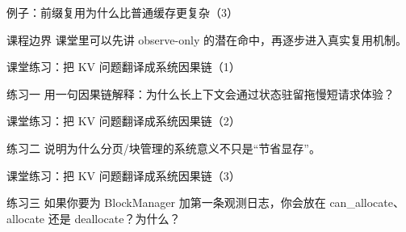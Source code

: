\begin{frame}{例子：前缀复用为什么比普通缓存更复杂（3）}
\begin{block}{课程边界}
    课堂里可以先讲 observe-only 的潜在命中，再逐步进入真实复用机制。
  \end{block}
\end{frame}

\begin{frame}{课堂练习：把 KV 问题翻译成系统因果链（1）}
\begin{block}{练习一}
    用一句因果链解释：为什么长上下文会通过状态驻留拖慢短请求体验？
  \end{block}
\end{frame}

\begin{frame}{课堂练习：把 KV 问题翻译成系统因果链（2）}
\begin{block}{练习二}
    说明为什么分页/块管理的系统意义不只是“节省显存”。
  \end{block}
\end{frame}

\begin{frame}{课堂练习：把 KV 问题翻译成系统因果链（3）}
\begin{block}{练习三}
    如果你要为 BlockManager 加第一条观测日志，你会放在 can\_allocate、allocate 还是 deallocate？为什么？
  \end{block}
\end{frame}
